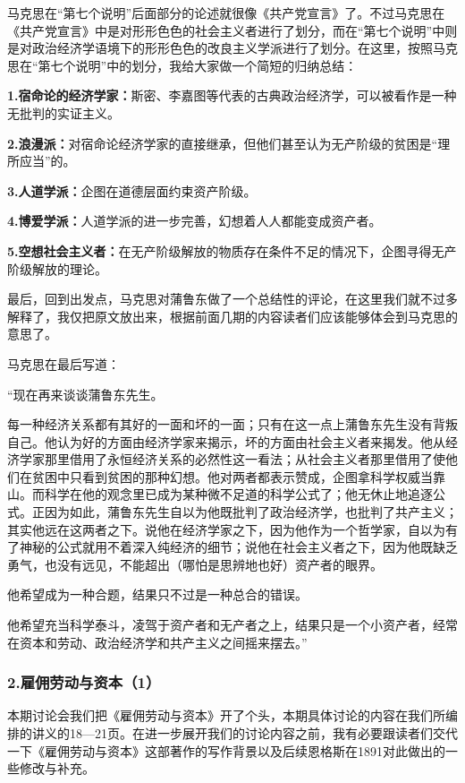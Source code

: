 \documentclass[a4paper,twoside,12pt,AutoFakeBold]{ctexart}
\begin{document}
马克思在“第七个说明”后面部分的论述就很像《共产党宣言》了。不过马克思在《共产党宣言》中是对形形色色的社会主义者进行了划分，而在“第七个说明”中则是对政治经济学语境下的形形色色的改良主义学派进行了划分。在这里，按照马克思在“第七个说明”中的划分，我给大家做一个简短的归纳总结：
\begin{tcolorbox}
    \textbf{1.宿命论的经济学家：}斯密、李嘉图等代表的古典政治经济学，可以被看作是一种无批判的实证主义。

    \textbf{2.浪漫派：}对宿命论经济学家的直接继承，但他们甚至认为无产阶级的贫困是“理所应当”的。

    \textbf{3.人道学派：}企图在道德层面约束资产阶级。

    \textbf{4.博爱学派：}人道学派的进一步完善，幻想着人人都能变成资产者。

    \textbf{5.空想社会主义者：}在无产阶级解放的物质存在条件不足的情况下，企图寻得无产阶级解放的理论。
\end{tcolorbox}

最后，回到出发点，马克思对蒲鲁东做了一个总结性的评论，在这里我们就不过多解释了，我仅把原文放出来，根据前面几期的内容读者们应该能够体会到马克思的意思了。

马克思在最后写道：
\begin{adjustwidth}{2em}{2em}
    \qquad\fangsong
    “现在再来谈谈蒲鲁东先生。

每一种经济关系都有其好的一面和坏的一面；只有在这一点上蒲鲁东先生没有背叛自己。他认为好的方面由经济学家来揭示，坏的方面由社会主义者来揭发。他从经济学家那里借用了永恒经济关系的必然性这一看法；从社会主义者那里借用了使他们在贫困中只看到贫困的那种幻想。他对两者都表示赞成，企图拿科学权威当靠山。而科学在他的观念里已成为某种微不足道的科学公式了；他无休止地追逐公式。正因为如此，蒲鲁东先生自以为他既批判了政治经济学，也批判了共产主义；其实他远在这两者之下。说他在经济学家之下，因为他作为一个哲学家，自以为有了神秘的公式就用不着深入纯经济的细节；说他在社会主义者之下，因为他既缺乏勇气，也没有远见，不能超出（哪怕是思辨地也好）资产者的眼界。

他希望成为一种合题，结果只不过是一种总合的错误。

他希望充当科学泰斗，凌驾于资产者和无产者之上，结果只是一个小资产者，经常在资本和劳动、政治经济学和共产主义之间摇来摆去。”
\end{adjustwidth}

\subsubsection{2.雇佣劳动与资本（1）}
本期讨论会我们把《雇佣劳动与资本》开了个头，本期具体讨论的内容在我们所编排的讲义的18—21页。在进一步展开我们的讨论内容之前，我有必要跟读者们交代一下《雇佣劳动与资本》这部著作的写作背景以及后续恩格斯在1891对此做出的一些修改与补充。
\end{document}
